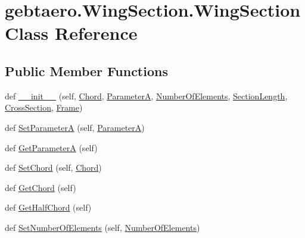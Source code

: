 \hypertarget{classgebtaero_1_1_wing_section_1_1_wing_section}{}\section{gebtaero.\+Wing\+Section.\+Wing\+Section Class Reference}
\label{classgebtaero_1_1_wing_section_1_1_wing_section}
\subsection*{Public Member Functions}
\begin{DoxyCompactItemize}
\item 
def \hyperlink{classgebtaero_1_1_wing_section_1_1_wing_section_aa313aa86c7d8588a0ce454b9268cf7a8}{\+\_\+\+\_\+init\+\_\+\+\_\+} (self, \hyperlink{classgebtaero_1_1_wing_section_1_1_wing_section_a844f4ac911b02212eb5c8a3d04bc2626}{Chord}, \hyperlink{classgebtaero_1_1_wing_section_1_1_wing_section_a0da2330696a15bce08b3ac29b2efaf17}{ParameterA}, \hyperlink{classgebtaero_1_1_wing_section_1_1_wing_section_a350cd9770457b51a9fc2d8c5a1171bf0}{Number\+Of\+Elements}, \hyperlink{classgebtaero_1_1_wing_section_1_1_wing_section_a87909d32978a886e9e329df69f7d918e}{Section\+Length}, \hyperlink{classgebtaero_1_1_cross_section_1_1_cross_section}{Cross\+Section}, \hyperlink{classgebtaero_1_1_frame_1_1_frame}{Frame})
\item 
def \hyperlink{classgebtaero_1_1_wing_section_1_1_wing_section_acb553aceb237ebac8cc046e4f4a46edf}{Set\+ParameterA} (self, \hyperlink{classgebtaero_1_1_wing_section_1_1_wing_section_a0da2330696a15bce08b3ac29b2efaf17}{ParameterA})
\item 
def \hyperlink{classgebtaero_1_1_wing_section_1_1_wing_section_adc79518e2f548a3aaee672b9206a83f4}{Get\+ParameterA} (self)
\item 
def \hyperlink{classgebtaero_1_1_wing_section_1_1_wing_section_a8371272d51d0381a5a39213aee9b1814}{Set\+Chord} (self, \hyperlink{classgebtaero_1_1_wing_section_1_1_wing_section_a844f4ac911b02212eb5c8a3d04bc2626}{Chord})
\item 
def \hyperlink{classgebtaero_1_1_wing_section_1_1_wing_section_a8221f8451dd85532c56dc9b2c1a2cd02}{Get\+Chord} (self)
\item 
def \hyperlink{classgebtaero_1_1_wing_section_1_1_wing_section_a2f91e7d10247a836983ad07c09130788}{Get\+Half\+Chord} (self)
\item 
def \hyperlink{classgebtaero_1_1_wing_section_1_1_wing_section_ad10719c65734570b888b9ab60431bf87}{Set\+Number\+Of\+Elements} (self, \hyperlink{classgebtaero_1_1_wing_section_1_1_wing_section_a350cd9770457b51a9fc2d8c5a1171bf0}{Number\+Of\+Elements})

\end{DoxyCompactItemize}
